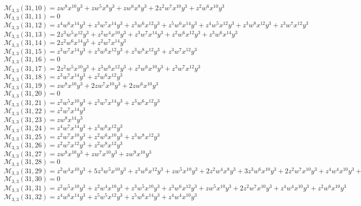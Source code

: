 \documentclass[12pt]{memoireuqam1.3}
\begin{document}
$\mathcal{M}_{3,3}(31,10)=zw^8x^{10}y^3+zw^5x^8y^3+zw^6x^8y^3+2z^2w^7x^{10}y^3+z^2w^6x^{10}y^3$\\
$\mathcal{M}_{3,3}(31,11)=0$\\
$\mathcal{M}_{3,3}(31,12)=z^4w^6x^{14}y^3+z^3w^7x^{14}y^3+z^3w^6x^{12}y^3+z^5w^6x^{14}y^3+z^4w^5x^{12}y^3+z^3w^8x^{12}y^3+z^3w^7x^{12}y^3$\\
$\mathcal{M}_{3,3}(31,13)=2z^3w^5x^{12}y^3+z^2w^4x^{10}y^3+z^3w^7x^{14}y^3+z^2w^6x^{12}y^3+z^3w^6x^{14}y^3$\\
$\mathcal{M}_{3,3}(31,14)=2z^2w^6x^{14}y^3+z^2w^7x^{14}y^3$\\
$\mathcal{M}_{3,3}(31,15)=z^3w^7x^{14}y^3+z^3w^6x^{12}y^3+z^3w^8x^{12}y^3+z^3w^7x^{12}y^3$\\
$\mathcal{M}_{3,3}(31,16)=0$\\
$\mathcal{M}_{3,3}(31,17)=2z^2w^5x^{10}y^3+z^3w^6x^{12}y^3+z^2w^6x^{10}y^3+z^3w^7x^{12}y^3$\\
$\mathcal{M}_{3,3}(31,18)=z^3w^7x^{14}y^3+z^2w^6x^{12}y^3$\\
$\mathcal{M}_{3,3}(31,19)=zw^8x^{10}y^3+2zw^7x^{10}y^3+2zw^6x^{10}y^3$\\
$\mathcal{M}_{3,3}(31,20)=0$\\
$\mathcal{M}_{3,3}(31,21)=z^2w^5x^{10}y^3+z^3w^7x^{14}y^3+z^3w^6x^{12}y^3$\\
$\mathcal{M}_{3,3}(31,22)=z^2w^7x^{14}y^3$\\
$\mathcal{M}_{3,3}(31,23)=zw^8x^{14}y^3$\\
$\mathcal{M}_{3,3}(31,24)=z^4w^7x^{14}y^3+z^3w^6x^{12}y^3$\\
$\mathcal{M}_{3,3}(31,25)=z^2w^7x^{10}y^3+z^2w^6x^{10}y^3+z^3w^8x^{12}y^3$\\
$\mathcal{M}_{3,3}(31,26)=z^2w^7x^{12}y^3+z^2w^8x^{12}y^3$\\
$\mathcal{M}_{3,3}(31,27)=zw^8x^{10}y^3+zw^7x^{10}y^3+zw^9x^{10}y^3$\\
$\mathcal{M}_{3,3}(31,28)=0$\\
$\mathcal{M}_{3,3}(31,29)=z^2w^4x^{10}y^3+5z^3w^5x^{10}y^3+z^3w^6x^{12}y^3+zw^5x^{10}y^3+2z^2w^4x^8y^3+3z^3w^6x^{10}y^3+2z^2w^7x^{10}y^3+z^4w^4x^{10}y^3+z^2w^5x^8y^3$\\
$\mathcal{M}_{3,3}(31,30)=0$\\
$\mathcal{M}_{3,3}(31,31)=z^2w^5x^{10}y^3+z^2w^4x^{10}y^3+z^3w^5x^{10}y^3+z^3w^6x^{12}y^3+zw^5x^{10}y^3+2z^2w^7x^{10}y^3+z^4w^4x^{10}y^3+z^2w^6x^{10}y^3$\\
$\mathcal{M}_{3,3}(31,32)=z^4w^6x^{14}y^3+z^5w^5x^{12}y^3+z^5w^6x^{14}y^3+z^4w^4x^{10}y^3$\\
\end{document}
